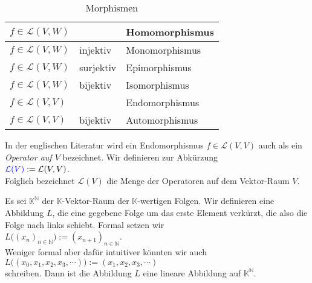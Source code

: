 \begin{table}[h]
  \centering
  \begin{tabular}{||l|l|l||}
    \hline
    \hline
   $f \in \mathcal{L}(V,W)$ &           & Homomorphismus \\ 
    \hline
   $f \in \mathcal{L}(V,W)$ & injektiv  & Monomorphismus \\ 
    \hline
   $f \in \mathcal{L}(V,W)$ & surjektiv & Epimorphismus \\ 
    \hline
   $f \in \mathcal{L}(V,W)$ & bijektiv  & Isomorphismus \\ 
    \hline
   $f \in \mathcal{L}(V,V)$ &           & Endomorphismus \\ 
    \hline
   $f \in \mathcal{L}(V,V)$ & bijektiv  & Automorphismus \\ 
    \hline
    \hline
  \end{tabular}
  \caption{Morphismen}
  \label{tab:morphism}
\end{table}

In der englischen Literatur wird ein  Endomorphismus $f \in \mathcal{L}(V,V)$ auch als ein
{\emph{\color{blue}Operator auf $V$}} bezeichnet.  Wir definieren zur Abk\"{u}rzung
\\[0.2cm]
\hspace*{1.3cm}
${\color{blue}\mathcal{L}(V)} := \mathcal{L}(V,V)$.
\\[0.2cm]
Folglich bezeichnet $\mathcal{L}(V)$ die Menge der Operatoren auf dem Vektor-Raum $V$.
\eoxs

\example
Es sei $\mathbb{K}^\mathbb{N}$ der $\mathbb{K}$-Vektor-Raum der $\mathbb{K}$-wertigen Folgen.  Wir definieren
eine Abbildung $L$, die eine gegebene Folge um das erste Element verk\"{u}rzt, die also die Folge nach
links schiebt.  Formal setzen wir
\\[0.2cm]
\hspace*{1.3cm}
$L\bigl( (x_n)_{n\in \mathbb{N}} \bigr) := (x_{n+1})_{n\in\mathbb{N}}$.
\\[0.2cm]
Weniger formal aber daf\"{u}r intuitiver k\"{o}nnten wir auch
\\[0.2cm]
\hspace*{1.3cm}
$L\bigl( (x_0, x_1, x_2, x_3, \cdots) \bigr) := (x_1, x_2, x_3, \cdots)$
\\[0.2cm]
schreiben.  Dann ist die Abbildung $L$ eine lineare Abbildung auf $\mathbb{K}^\mathbb{N}$.
\eoxs

